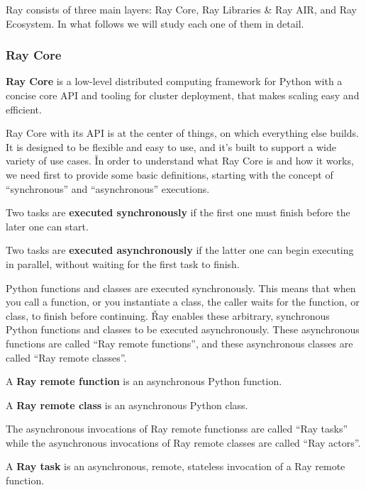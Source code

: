 Ray consists of three main layers: Ray Core, Ray Libraries \& Ray AIR, and Ray Ecosystem. In what follows we will
study each one of them in detail.

\subsubsection{Ray Core}

\textbf{Ray Core} is a low-level distributed computing framework for Python with a concise core API and tooling
for cluster deployment, that makes scaling easy and efficient.
\ed

Ray Core with its API is at the center of things, on which everything else builds. It is designed to be flexible and
easy to use, and it's built to support a wide variety of use cases. \v

In order to understand what Ray Core is and how it works, we need first to provide some basic definitions, starting
with the concept of ``synchronous'' and ``asynchronous'' executions.

Two tasks are \textbf{executed synchronously} if the first one must finish before the later one can start.
\ed

Two tasks are \textbf{executed asynchronously} if the latter one can begin executing in parallel, without waiting for
the first task to finish.
\ed

Python functions and classes are executed synchronously. This means that when you call a function, or you instantiate
a class, the caller waits for the function, or class, to finish before continuing. \v

Ray enables these arbitrary, synchronous Python functions and classes to be executed asynchronously. These
asynchronous functions are called ``Ray remote functions'', and these asynchronous classes are called ``Ray remote
classes''.

A \textbf{Ray remote function} is an asynchronous Python function.
\ed

A \textbf{Ray remote class} is an asynchronous Python class.
\ed

The asynchronous invocations of Ray remote functionss are called ``Ray tasks'' while the asynchronous invocations of
Ray remote classes are called ``Ray actors''.

A \textbf{Ray task} is an asynchronous, remote, stateless invocation of a Ray remote function.
\ed

